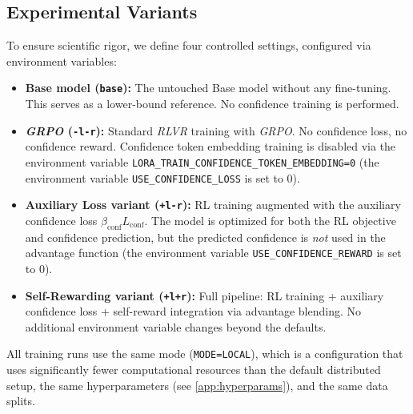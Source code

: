 \documentclass[a4paper,oneside,10pt,ngerman,english]{scrartcl}
\begin{document}
\subsection{Experimental Variants}
\label{sec:variants}
To ensure scientific rigor, we define four controlled settings, configured via environment variables:
\begin{itemize}
	\item \textbf{Base model (\texttt{base}):} The untouched Base model without any fine-tuning. This serves as a lower-bound reference. No confidence training is performed.
	\item \textbf{\textit{GRPO} (\texttt{-l-r}):} Standard \textit{RLVR} training with \textit{GRPO}. No confidence loss, no confidence reward. Confidence token embedding training is disabled via the environment variable \texttt{LORA\_TRAIN\_CONFIDENCE\_TOKEN\_EMBEDDING=0} (the environment variable \texttt{USE\_CONFIDENCE\_LOSS} is set to $0$).
	\item \textbf{Auxiliary Loss variant (\texttt{+l-r}):} RL training augmented with the auxiliary confidence loss $\beta_{\mathrm{conf}} L_{\mathrm{conf}}$. The model is optimized for both the RL objective and confidence prediction, but the predicted confidence is \textit{not} used in the advantage function (the environment variable \texttt{USE\_CONFIDENCE\_REWARD} is set to $0$).
	\item \textbf{Self-Rewarding variant (\texttt{+l+r}):} Full pipeline: RL training + auxiliary confidence loss + self-reward integration via advantage blending. No additional environment variable changes beyond the defaults.
\end{itemize}
All training runs use the same mode (\texttt{MODE=LOCAL}), which is a configuration that uses significantly fewer computational resources than the default distributed setup, the same hyperparameters (see \autoref{app:hyperparams}), and the same data splits.
\end{document}
